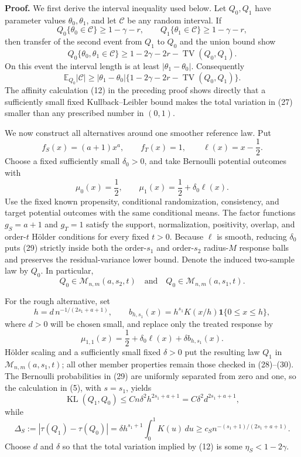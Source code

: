 \textbf{Proof.}
We first derive the interval inequality used below. Let \(Q_0,Q_1\) have parameter values \(\theta_0,\theta_1\), and let \(\mathcal C\) be any random interval. If
\[
Q_0\{\theta_0\in\mathcal C\}\ge1-\gamma-r,
\qquad
Q_1\{\theta_1\in\mathcal C\}\ge1-\gamma-r,
\tag{25}
\]
then transfer of the second event from \(Q_1\) to \(Q_0\) and the union bound show
\[
Q_0\{\theta_0,\theta_1\in\mathcal C\}
\ge1-2\gamma-2r-\operatorname{TV}(Q_0,Q_1).
\tag{26}
\]
On this event the interval length is at least \(|\theta_1-\theta_0|\). Consequently
\[
\mathbb E_{Q_0}|\mathcal C|
\ge |\theta_1-\theta_0|
 \{1-2\gamma-2r-\operatorname{TV}(Q_0,Q_1)\}.
\tag{27}
\]
The affinity calculation (12) in the preceding proof shows directly that a sufficiently small fixed Kullback--Leibler bound makes the total variation in (27) smaller than any prescribed number in \((0,1)\).

We now construct all alternatives around one smoother reference law. Put
\[
f_S(x)=(a+1)x^a,
\qquad
f_T(x)=1,
\qquad
\ell(x)=x-\frac12.
\tag{28}
\]
Choose a fixed sufficiently small \(\delta_0>0\), and take Bernoulli potential outcomes with
\[
\mu_0(x)=\frac12,
\qquad
\mu_1(x)=\frac12+\delta_0\ell(x).
\tag{29}
\]
Use the fixed known propensity, conditional randomization, consistency, and target potential outcomes with the same conditional means. The factor functions \(g_S=a+1\) and \(g_T=1\) satisfy the support, normalization, positivity, overlap, and order-\(t\) Hölder conditions for every fixed \(t>0\). Because \(\ell\) is smooth, reducing \(\delta_0\) puts (29) strictly inside both the order-\(s_1\) and order-\(s_2\) radius-\(M\) response balls and preserves the residual-variance lower bound. Denote the induced two-sample law by \(Q_0\). In particular,
\[
Q_0\in\mathcal M_{n,m}(a,s_2,t)
\quad\text{and}\quad
Q_0\in\mathcal M_{n,m}(a,s_1,t).
\tag{30}
\]

For the rough alternative, set
\[
h=d\,n^{-1/(2s_1+a+1)},
\qquad
b_{h,s_1}(x)=h^{s_1}K(x/h)\mathbf 1\{0\le x\le h\},
\tag{31}
\]
where \(d>0\) will be chosen small, and replace only the treated response by
\[
\mu_{1,1}(x)=\frac12+\delta_0\ell(x)+\delta b_{h,s_1}(x).
\tag{32}
\]
Hölder scaling and a sufficiently small fixed \(\delta>0\) put the resulting law \(Q_1\) in \(\mathcal M_{n,m}(a,s_1,t)\); all other member properties remain those checked in (28)--(30). The Bernoulli probabilities in (29) are uniformly separated from zero and one, so the calculation in (5), with \(s=s_1\), yields
\[
\operatorname{KL}(Q_1,Q_0)
\le Cn\delta^2h^{2s_1+a+1}
=C\delta^2d^{2s_1+a+1},
\tag{33}
\]
while
\[
\Delta_S:=|\tau(Q_1)-\tau(Q_0)|
=\delta h^{s_1+1}\int_0^1K(u)\,du
\ge c_Sn^{-(s_1+1)/(2s_1+a+1)}.
\tag{34}
\]
Choose \(d\) and \(\delta\) so that the total variation implied by (12) is some \(\eta_S<1-2\gamma\).

